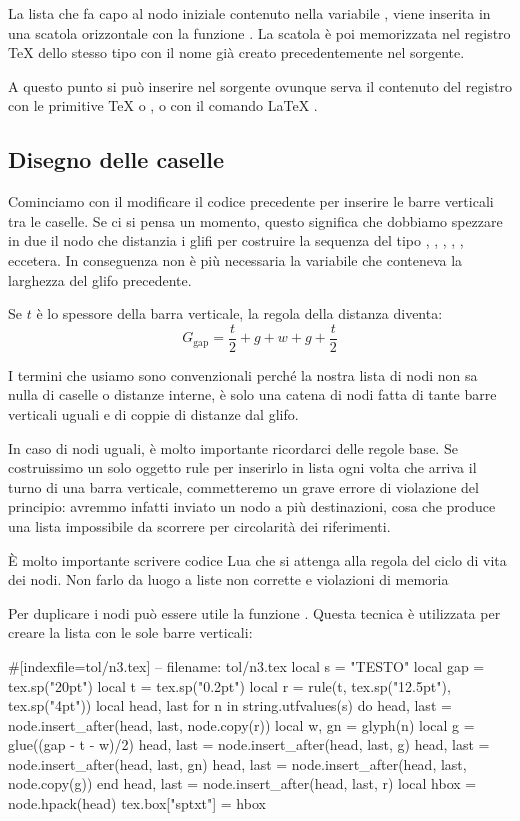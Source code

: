 La lista che fa capo al nodo iniziale contenuto nella variabile ,
viene inserita in una scatola orizzontale con la funzione
. La scatola è poi memorizzata nel registro
\TeX{} dello stesso tipo con il nome  già creato precedentemente
nel sorgente.

A questo punto si può inserire nel sorgente ovunque serva il contenuto del
registro con le primitive \TeX{}  o , o con il comando \LaTeX{}
.


\subsection{Disegno delle caselle}

Cominciamo con il modificare il codice precedente per inserire le barre
verticali tra le caselle. Se ci si pensa un momento, questo significa che
dobbiamo spezzare in due il nodo che distanzia i glifi per costruire la sequenza
del tipo , , , , ,
eccetera. In conseguenza non è più necessaria la variabile  che
conteneva la larghezza del glifo precedente.

Se \( t \) è lo spessore della barra verticale, la regola della distanza
diventa:
\[
    G_\mathrm{gap} = \frac{t}{2} + g + w + g + \frac{t}{2}
\]

I termini che usiamo sono convenzionali perché la nostra lista di nodi non sa
nulla di caselle o distanze interne, è solo una catena di nodi fatta di tante
barre verticali uguali e di coppie di distanze dal glifo.

In caso di nodi uguali, è molto importante ricordarci delle regole base. Se
costruissimo un solo oggetto rule per inserirlo in lista ogni volta che arriva
il turno di una barra verticale, commetteremo un grave errore di violazione del
principio: avremmo infatti inviato un nodo a più destinazioni, cosa che produce
una lista impossibile da scorrere per circolarità dei riferimenti.

È molto importante scrivere codice Lua che si attenga alla regola del ciclo di
vita dei nodi. Non farlo da luogo a liste non corrette e violazioni di memoria

Per duplicare i nodi può essere utile la funzione
. Questa tecnica è utilizzata per creare la
lista con le sole barre verticali:
\begin{lines}
#[indexfile=tol/n3.tex]
-- filename: tol/n3.tex
local s = "TESTO"
local gap = tex.sp("20pt")
local t = tex.sp("0.2pt")
local r = rule(t, tex.sp("12.5pt"), tex.sp("4pt"))
local head, last
for n in string.utfvalues(s) do
    head, last = node.insert_after(head, last, node.copy(r))
    local w, gn = glyph(n)
    local g = glue((gap - t - w)/2)
    head, last = node.insert_after(head, last, g)
    head, last = node.insert_after(head, last, gn)
    head, last = node.insert_after(head, last, node.copy(g))
end
head, last = node.insert_after(head, last, r)
local hbox = node.hpack(head)
tex.box["sptxt"] = hbox
\end{lines}

